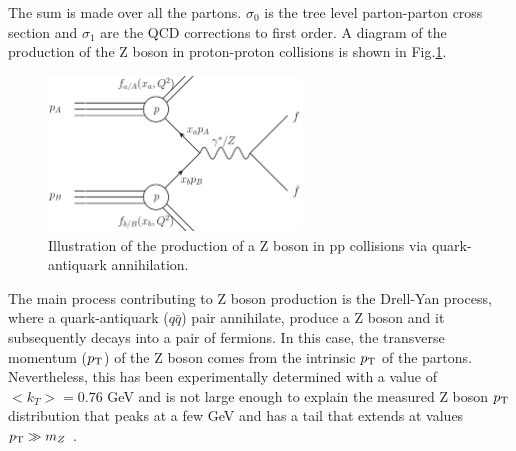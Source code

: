 The sum is made over all the partons. $\sigma_0$ is the tree level parton-parton cross section and $\sigma_1$ are the QCD corrections to first order. A diagram of the production of the Z boson in proton-proton collisions is shown in Fig.\ref{Fig15}. 
\begin{figure}[h]
	\centering
	\includegraphics[width=0.6\textwidth]{figures/Fig15}
	\caption{Illustration of the production of a Z boson in pp collisions via quark-antiquark annihilation.}
	\label{Fig15}
\end{figure}
The main process contributing to Z boson production is the Drell-Yan process, where a quark-antiquark ($q\bar{q}$) pair annihilate, produce a Z boson and it subsequently decays into a pair of fermions. In this case, the transverse momentum ($p_\text{T}$) of the Z boson comes from the intrinsic $p_\text{T}$ of the partons. Nevertheless, this has been experimentally determined with a value of $<k_T>=0.76$ GeV \cite{Ellis:1991qj} and is not large enough to explain the measured Z boson $p_\text{T}$ distribution that peaks at a few GeV and has a tail that extends at values $p_\text{T}\gg m_Z$ \cite{Abbott:1999yd,Affolder:1999jh}.

